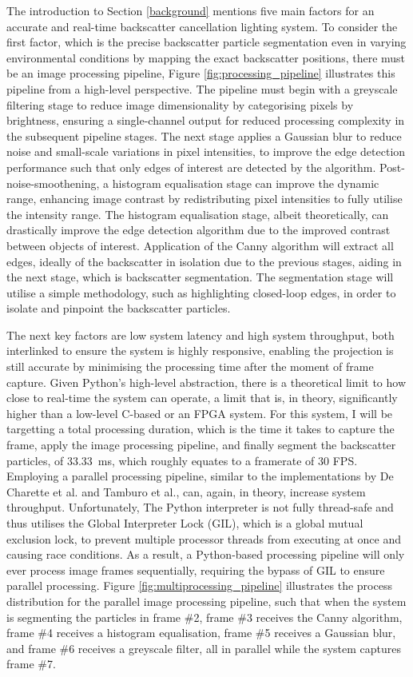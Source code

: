 The introduction to Section \ref{background} mentions five main factors for an accurate and real-time backscatter cancellation lighting system. To consider the first factor, which is the precise backscatter particle segmentation even in varying environmental conditions by mapping the exact backscatter positions, there must be an image processing pipeline, Figure \ref{fig:processing_pipeline} illustrates this pipeline from a high-level perspective. The pipeline must begin with a greyscale filtering stage to reduce image dimensionality by categorising pixels by brightness, ensuring a single-channel output for reduced processing complexity in the subsequent pipeline stages. The next stage applies a Gaussian blur to reduce noise and small-scale variations in pixel intensities, to improve the edge detection performance such that only edges of interest are detected by the algorithm. Post-noise-smoothening, a histogram equalisation stage can improve the dynamic range, enhancing image contrast by redistributing pixel intensities to fully utilise the intensity range. The histogram equalisation stage, albeit theoretically, can drastically improve the edge detection algorithm due to the improved contrast between objects of interest. Application of the Canny algorithm will extract all edges, ideally of the backscatter in isolation due to the previous stages, aiding in the next stage, which is backscatter segmentation. The segmentation stage will utilise a simple methodology, such as highlighting closed-loop edges, in order to isolate and pinpoint the backscatter particles.

The next key factors are low system latency and high system throughput, both interlinked to ensure the system is highly responsive, enabling the projection is still accurate by minimising the processing time after the moment of frame capture. Given Python's high-level abstraction, there is a theoretical limit to how close to real-time the system can operate, a limit that is, in theory, significantly higher than a low-level C-based or an FPGA system. For this system, I will be targetting a total processing duration, which is the time it takes to capture the frame, apply the image processing pipeline, and finally segment the backscatter particles, of \SI{33.33}{\milli\second}, which roughly equates to a framerate of 30 FPS. Employing a parallel processing pipeline, similar to the implementations by De Charette et al. and Tamburo et al., can, again, in theory, increase system throughput. Unfortunately, The Python interpreter is not fully thread-safe and thus utilises the Global Interpreter Lock (GIL), which is a global mutual exclusion lock, to prevent multiple processor threads from executing at once and causing race conditions. As a result, a Python-based processing pipeline will only ever process image frames sequentially, requiring the bypass of GIL to ensure parallel processing. Figure \ref{fig:multiprocessing_pipeline} illustrates the process distribution for the parallel image processing pipeline, such that when the system is segmenting the particles in frame \#2, frame \#3 receives the Canny algorithm, frame \#4 receives a histogram equalisation, frame \#5 receives a Gaussian blur, and frame \#6 receives a greyscale filter, all in parallel while the system captures frame \#7.

